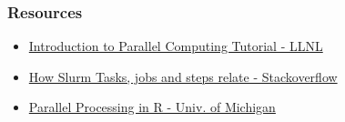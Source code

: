\documentclass{beamer}
\newcommand{\code}[1]{\colorbox{codegray}{\texttt{#1}}}
\begin{document}




%
%
%
%
%
%


\begin{frame}
\frametitle{Resources}
\begin{itemize}
    \item \href{https://hpc.llnl.gov/documentation/tutorials/introduction-parallel-computing-tutorial}{\color{blue}Introduction to Parallel Computing Tutorial - LLNL}
    \item \href{https://stackoverflow.com/a/46532581/4021436}{\color{blue}How Slurm Tasks, jobs and steps relate - Stackoverflow}
    \item \href{https://dept.stat.lsa.umich.edu/~jerrick/courses/stat701/notes/parallel.html}{\color{blue}Parallel Processing in R - Univ. of Michigan}
    \bigskip
\end{itemize}
\end{frame}
\end{document}
